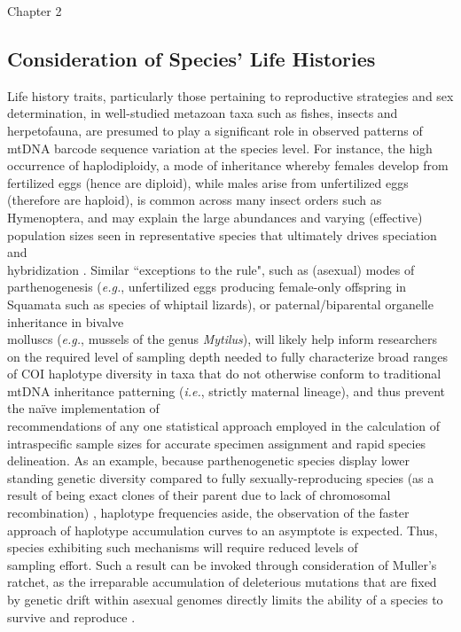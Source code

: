 Chapter 2

\subsection{Consideration of Species' Life Histories}

Life history traits, particularly those pertaining to reproductive strategies and sex \\ determination, in well-studied metazoan taxa such as fishes, insects and herpetofauna, are presumed to play a significant role in observed patterns of mtDNA barcode sequence variation at the species level. For instance, the high occurrence of haplodiploidy, a mode of inheritance whereby females develop from fertilized eggs (hence are diploid), while males arise from unfertilized eggs (therefore are haploid), is common across many insect orders such as Hymenoptera, and may explain the large abundances and varying (effective) population sizes seen in representative species that ultimately drives speciation and \\ hybridization \cite{hebert2016counting}. Similar ``exceptions to the rule", such as (asexual) modes of \\ parthenogenesis (\textit{e.g.}, unfertilized eggs producing female-only offspring in Squamata such as species of whiptail lizards), or paternal/biparental organelle inheritance in bivalve \\ molluscs (\textit{e.g.}, mussels of the genus \textit{Mytilus}), will likely help inform researchers on the required level of sampling depth needed to fully characterize broad ranges of COI haplotype diversity in taxa that do not otherwise conform to traditional mtDNA inheritance patterning (\textit{i.e.}, strictly maternal lineage), and thus prevent the na\"ive implementation of \\ recommendations of any one statistical approach employed in the calculation of \\ intraspecific sample sizes for accurate specimen assignment and rapid species delineation. As an example, because parthenogenetic species display lower standing genetic diversity compared to fully sexually-reproducing species (as a result of being exact clones of their parent due to lack of chromosomal recombination) \cite{bengtsson2003genetic}, haplotype frequencies aside, the observation of the faster approach of haplotype accumulation curves to an asymptote is expected. Thus, species exhibiting such mechanisms will require reduced levels of \\ sampling effort. Such a result can be invoked through consideration of Muller's ratchet, as the irreparable accumulation of deleterious mutations that are fixed by genetic drift within asexual genomes directly limits the ability of a species to survive and reproduce \cite{felenstein1974evolutionary, muller1964relation}. 


